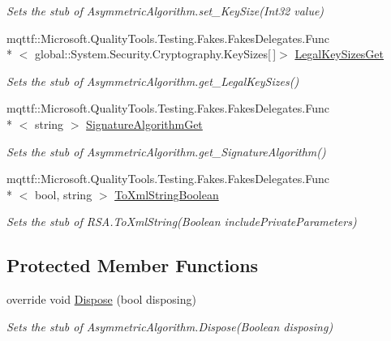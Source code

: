 \begin{DoxyCompactItemize}
\begin{DoxyCompactList}\small\item\em Sets the stub of Asymmetric\-Algorithm.\-set\-\_\-\-Key\-Size(\-Int32 value)\end{DoxyCompactList}\item 
mqttf\-::\-Microsoft.\-Quality\-Tools.\-Testing.\-Fakes.\-Fakes\-Delegates.\-Func\\*
$<$ global\-::\-System.\-Security.\-Cryptography.\-Key\-Sizes\mbox{[}$\,$\mbox{]}$>$ \hyperlink{class_system_1_1_security_1_1_cryptography_1_1_fakes_1_1_stub_r_s_a_a8c9f5f84d2c109788bf299dd73961fd0}{Legal\-Key\-Sizes\-Get}
\begin{DoxyCompactList}\small\item\em Sets the stub of Asymmetric\-Algorithm.\-get\-\_\-\-Legal\-Key\-Sizes()\end{DoxyCompactList}\item 
mqttf\-::\-Microsoft.\-Quality\-Tools.\-Testing.\-Fakes.\-Fakes\-Delegates.\-Func\\*
$<$ string $>$ \hyperlink{class_system_1_1_security_1_1_cryptography_1_1_fakes_1_1_stub_r_s_a_a3af04fe823829e9cbae90a66934fb42e}{Signature\-Algorithm\-Get}
\begin{DoxyCompactList}\small\item\em Sets the stub of Asymmetric\-Algorithm.\-get\-\_\-\-Signature\-Algorithm()\end{DoxyCompactList}\item 
mqttf\-::\-Microsoft.\-Quality\-Tools.\-Testing.\-Fakes.\-Fakes\-Delegates.\-Func\\*
$<$ bool, string $>$ \hyperlink{class_system_1_1_security_1_1_cryptography_1_1_fakes_1_1_stub_r_s_a_af38cfe34d157647c04e3afca8cb82e12}{To\-Xml\-String\-Boolean}
\begin{DoxyCompactList}\small\item\em Sets the stub of R\-S\-A.\-To\-Xml\-String(\-Boolean include\-Private\-Parameters)\end{DoxyCompactList}\end{DoxyCompactItemize}
\subsection*{Protected Member Functions}
\begin{DoxyCompactItemize}
\item 
override void \hyperlink{class_system_1_1_security_1_1_cryptography_1_1_fakes_1_1_stub_r_s_a_abfcf0b96ddf5ffa454309024c5b10701}{Dispose} (bool disposing)
\begin{DoxyCompactList}\small\item\em Sets the stub of Asymmetric\-Algorithm.\-Dispose(\-Boolean disposing)\end{DoxyCompactList}\end{DoxyCompactItemize}

